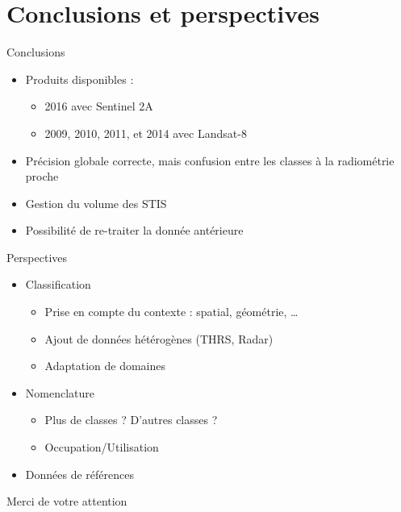 \documentclass[pressentation,10pt,aspectratio=1610, xcolor=table]{beamer}
\begin{document}
\section{Conclusions et perspectives}
\label{sec:orgadefc11}
\begin{frame}[label={sec:orgabe0391}]{Conclusions}
\begin{itemize}
\item Produits disponibles : 
\begin{itemize}
\item 2016 avec Sentinel 2A
\item 2009, 2010, 2011, et 2014 avec Landsat-8
\end{itemize}
\item Précision globale correcte, mais confusion entre les classes à la radiométrie proche
\item Gestion du volume des STIS
\item Possibilité de re-traiter la donnée antérieure
\end{itemize}
\end{frame}
\begin{frame}[label={sec:orgcfdf474}]{Perspectives}
\begin{itemize}
\item Classification
\begin{itemize}
\item Prise en compte du contexte : spatial, géométrie, \ldots{}
\item Ajout de données hétérogènes (THRS, Radar)
\item Adaptation de domaines
\end{itemize}
\item Nomenclature
\begin{itemize}
\item Plus de classes ? D'autres classes ?
\item Occupation/Utilisation
\end{itemize}
\item Données de références
\end{itemize}
\end{frame}
\begin{frame}[label=conclusion,standout]{}
\begin{center}
Merci de votre attention
\end{center}
\end{frame}
\end{document}

